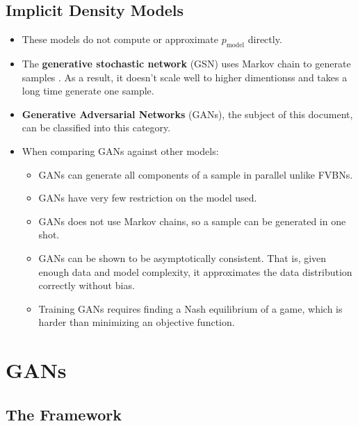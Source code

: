 \documentclass[10pt]{article}
\begin{document}
  \subsection{Implicit Density Models}

  \begin{itemize}
    \item These models do not compute or approximate $p_{\mathrm{model}}$ directly.

    \item The \textbf{generative stochastic network} (GSN) uses Markov chain to  generate samples \cite{Alain:2015}. As a result, it doesn't scale well to higher dimentionss and takes a long time generate one sample.

    \item \textbf{Generative Adversarial Networks} (GANs), the subject of this document, can be classified into this category.

    \item When comparing GANs against other models:
    \begin{itemize}
      \item GANs can generate all components of a sample in parallel unlike FVBNs.

      \item GANs have very few restriction on the model used.

      \item GANs does not use Markov chains, so a sample can be generated in one shot.

      \item GANs can be shown to be asymptotically consistent. That is, given enough data and model complexity, it approximates the data distribution correctly without bias.

      \item Training GANs requires finding a Nash equilibrium of a game, which is harder than minimizing an objective function.      
    \end{itemize}
  \end{itemize}

  \section{GANs}

  \subsection{The Framework}
\end{document}

